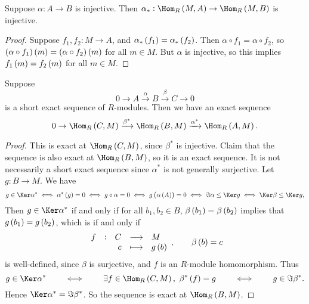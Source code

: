 \begin{proposition}
Suppose $ \alpha : A \to B $ is injective. Then $ \alpha_* : \Hom_R\br{M, A} \to \Hom_R\br{M, B} $ is injective.
\end{proposition}

\begin{proof}
Suppose $ f_1, f_2 : M \to A $, and $ \alpha_*\br{f_1} = \alpha_*\br{f_2} $. Then $ \alpha \circ f_1 = \alpha \circ f_2 $, so $ \br{\alpha \circ f_1}\br{m} = \br{\alpha \circ f_2}\br{m} $ for all $ m \in M $. But $ \alpha $ is injective, so this implies $ f_1\br{m} = f_2\br{m} $ for all $ m \in M $.
\end{proof}

\pagebreak

\begin{proposition}
Suppose
$$ 0 \to A \xrightarrow{\alpha} B \xrightarrow{\beta} C \to 0 $$
is a short exact sequence of $ R $-modules. Then we have an exact sequence
$$ 0 \to \Hom_R\br{C, M} \xrightarrow{\beta^*} \Hom_R\br{B, M} \xrightarrow{\alpha^*} \Hom_R\br{A, M}. $$
\end{proposition}

\begin{proof}
This is exact at $ \Hom_R\br{C, M} $, since $ \beta^* $ is injective. Claim that the sequence is also exact at $ \Hom_R\br{B, M} $, so it is an exact sequence. It is not necessarily a short exact sequence since $ \alpha^* $ is not generally surjective. Let $ g : B \to M $. We have
$$ g \in \Ker \alpha^* \iff \alpha^*\br{g} = 0 \iff g \circ \alpha = 0 \iff g\br{\alpha\br{A}} = 0 \iff \Im \alpha \le \Ker g \iff \Ker \beta \le \Ker g, $$
Then $ g \in \Ker \alpha^* $ if and only if for all $ b_1, b_2 \in B $, $ \beta\br{b_1} = \beta\br{b_2} $ implies that $ g\br{b_1} = g\br{b_2} $, which is if and only if
$$ \function[f]{C}{M}{c}{g\br{b}}, \qquad \beta\br{b} = c $$
is well-defined, since $ \beta $ is surjective, and $ f $ is an $ R $-module homomorphism. Thus
$$ g \in \Ker \alpha^* \qquad \iff \qquad \exists f \in \Hom_R\br{C, M}, \ \beta^*\br{f} = g \qquad \iff \qquad g \in \Im \beta^*. $$
Hence $ \Ker \alpha^* = \Im \beta^* $. So the sequence is exact at $ \Hom_R\br{B, M} $.
\end{proof}


